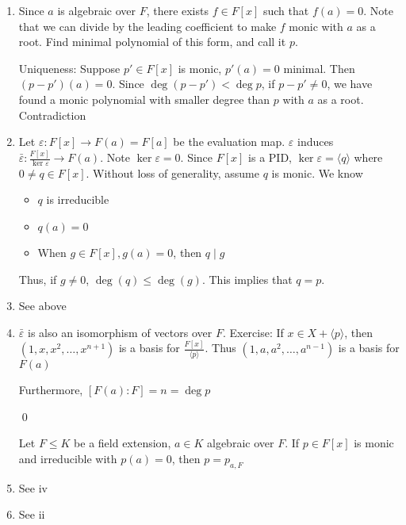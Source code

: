 \documentclass[x11names,reqno,14pt]{extarticle}
\begin{document}
\begin{enumerate}[label=(\roman*)]

\item Since $a$ is algebraic over $F$, there exists $f \in F[x]$ such that $f(a) = 0$. Note that we can divide by the leading coefficient to make $f$ monic with $a$ as a root. Find minimal polynomial of this form, and call it $p$. 

Uniqueness: Suppose $p' \in F[x]$ is monic, $p'(a) = 0$ minimal. Then $(p - p')(a) = 0$. Since $\deg(p - p') < \deg p$, if $p - p' \neq 0$, we have found a monic polynomial with smaller degree than $p$ with $a$ as a root. Contradiction

\item Let $\varepsilon:F[x]\to F(a) = F[a]$ be the evaluation map. $\varepsilon$ induces $\bar{\varepsilon}:\frac{F[x]}{\ker\varepsilon} \to F(a)$. Note $\ker\varepsilon=0$. Since $F[x]$ is a PID, $\ker\varepsilon = \langle q \rangle$ where $0 \neq q \in F[x]$. Without loss of generality, assume $q$ is monic. We know
\begin{itemize}

\item $q$ is irreducible
\item $q(a) = 0$
\item When $g \in F[x], g(a) = 0$, then $q \mid g$

\end{itemize}

Thus, if $g \neq 0$, $\deg (q) \leq \deg (g)$. This implies that $q = p$.

\item See above 

\item $\bar{\varepsilon}$ is also an isomorphism of vectors over $F$. Exercise: If $x \in X + \langle p \rangle$, then $(1, x, x^2, \dots, x^{n + 1})$ is a basis for $\frac{F[x]}{\langle p \rangle}$. Thus $(1, a, a^2, \dots, a^{n - 1})$ is a basis for $F(a)$

Furthermore, $[F(a):F] = n = \deg p$

\qed

Let $F \leq K$ be a field extension, $a \in K$ algebraic over $F$. If $p \in F[x]$ is monic and irreducible with $p(a) = 0$, then $p = p_{a, F}$

\item See iv

\item See ii


\end{enumerate}
\end{document}
